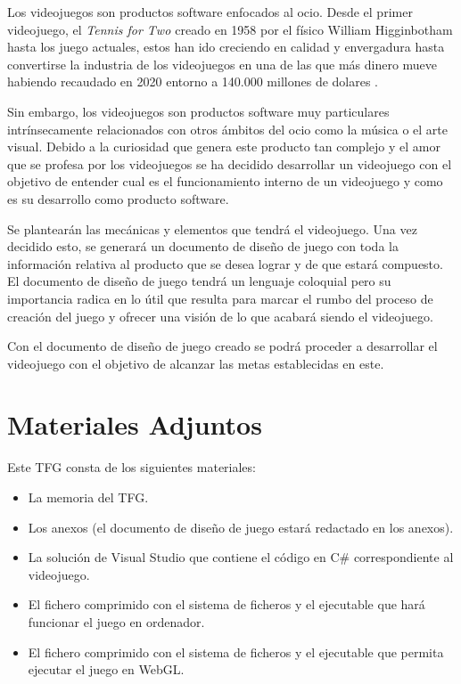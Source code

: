
Los videojuegos son productos software enfocados al ocio. Desde el primer videojuego, el \textit{Tennis for Two \cite{Tennis4two}} creado en 1958 por el físico William Higginbotham hasta los juego actuales, estos han ido creciendo en calidad y envergadura hasta convertirse la industria de los videojuegos en una de las que más dinero mueve habiendo recaudado en 2020 entorno a 140.000 millones de dolares \cite{2020GamesMoney}.

Sin embargo, los videojuegos son productos software muy particulares intrínsecamente relacionados con otros ámbitos del ocio como la música o el arte visual. Debido a la curiosidad que genera este producto tan complejo y el amor que se profesa por los videojuegos se ha decidido desarrollar un videojuego con el objetivo de entender cual es el funcionamiento interno de un videojuego y como es su desarrollo como producto software.

Se plantearán las mecánicas y elementos que tendrá el videojuego. Una vez decidido esto, se generará un documento de diseño de juego con toda la información relativa al producto que se desea lograr y de que estará compuesto. El documento de diseño de juego tendrá un lenguaje coloquial pero su importancia radica en lo útil que resulta para marcar el rumbo del proceso de creación del juego y ofrecer una visión de lo que acabará siendo el videojuego.

Con el documento de diseño de juego creado se podrá proceder a desarrollar el videojuego con el objetivo de alcanzar las metas establecidas en este.

\section{Materiales Adjuntos}
Este TFG consta de los siguientes materiales:
\begin{itemize}
\item
La memoria del TFG.
\item
Los anexos (el documento de diseño de juego estará redactado en los anexos).
\item
La solución de Visual Studio que contiene el código en C\# correspondiente al videojuego.
\item
El fichero comprimido con el sistema de ficheros y el ejecutable que hará funcionar el juego en ordenador.
\item
El fichero comprimido con el sistema de ficheros y el ejecutable que permita ejecutar el juego en WebGL.
\end{itemize}

